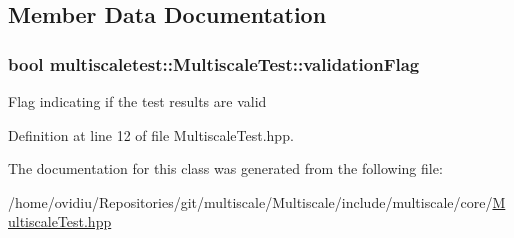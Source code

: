 \subsection{Member Data Documentation}
\hypertarget{classmultiscaletest_1_1MultiscaleTest_a0a15b3e8510007c85ca5af092c248c9c}{
\subsubsection[{validation\-Flag}]{\setlength{\rightskip}{0pt plus 5cm}bool multiscaletest\-::\-Multiscale\-Test\-::validation\-Flag\hspace{0.3cm}{\ttfamily [protected]}}}\label{classmultiscaletest_1_1MultiscaleTest_a0a15b3e8510007c85ca5af092c248c9c}
Flag indicating if the test results are valid 

Definition at line 12 of file Multiscale\-Test.\-hpp.



The documentation for this class was generated from the following file\-:\begin{DoxyCompactItemize}
\item 
/home/ovidiu/\-Repositories/git/multiscale/\-Multiscale/include/multiscale/core/\hyperlink{MultiscaleTest_8hpp}{Multiscale\-Test.\-hpp}\end{DoxyCompactItemize}
